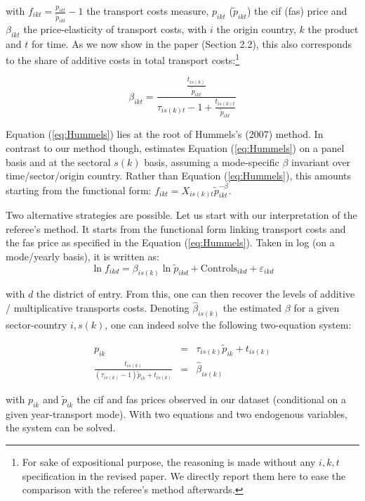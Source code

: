 \documentclass[a4paper,11pt]{article}
\begin{document}
\begin{itemize}
     with $f_{ikt} = \frac{p_{ikt}}{\widetilde{p}_{ikt}} -1 $ the transport costs measure, $p_{ikt}$ ($\widetilde{p}_{ikt}$) the cif (fas) price and $\beta_{ikt}$ the price-elasticity of transport costs, with $i$ the origin country, $k$ the product and $t$ for time. As we now show in the paper (Section 2.2), this also corresponds to the share of additive costs in total transport costs:\footnote{For sake of expositional purpose, the reasoning is made without any $i,k,t$ specification in the revised paper. We directly report them here to ease the comparison with the referee's method afterwards.}

     \begin{equation}
     \beta_{ikt} = \frac{\frac{t_{is(k)}}{\widetilde{p}_{ikt}}}{\tau_{is(k)t}-1+\frac{t_{is(k)t}}{\widetilde{p}_{ikt}} } \label{eq:beta_TC}
     \end{equation}

     Equation (\ref{eq:Hummels}) lies at the root of Hummels's (2007) method. In contrast to our method though, \cite{hummels2007} estimates Equation (\ref{eq:Hummels}) on a panel basis and at the sectoral $s(k)$ basis, assuming a mode-specific $\beta$ invariant over time/sector/origin country. Rather than Equation (\ref{eq:Hummels}), this amounts starting from the functional form: $f_{ikt} = X_{is(k)t}\widetilde{p}_{ikt}^{-\beta}$.

     Two alternative strategies are possible. Let us start with our interpretation of the referee's method. It starts from the functional form linking transport costs and the fas price as specified in the Equation (\ref{eq:Hummels}). Taken in log (on a mode/yearly basis), it is written as:
     $$\ln f_{ikd} = \beta_{is(k)}\ln \widetilde{p}_{ikd} +\text{Controls}_{ikd}+ \varepsilon_{ikd}$$

     \noindent with $d$ the district of entry. From this, one can then recover the levels of additive / multiplicative transports costs. Denoting $\widehat{\beta}_{is(k)}$ the estimated $\beta$ for a given sector-country $i,s(k)$, one can indeed solve the following two-equation system:

\begin{eqnarray}
p_{ik} &=& \tau_{is(k)}\widetilde{p}_{ik} +t_{is(k)} \label{eq:system1}\\
\frac{t_{is(k)}}{(\tau_{is(k)}-1)\widetilde{p}_{ik}+ t_{is(k)}} &=& \widehat{\beta}_{is(k)}  \label{eq:system2}
\end{eqnarray}

\noindent with $p_{ik}$ and $\widetilde{p}_{ik}$ the cif and fas prices observed in our dataset (conditional on a given year-transport mode). With two equations and two endogenous variables, the system can be solved.


\end{itemize}
\end{document}
